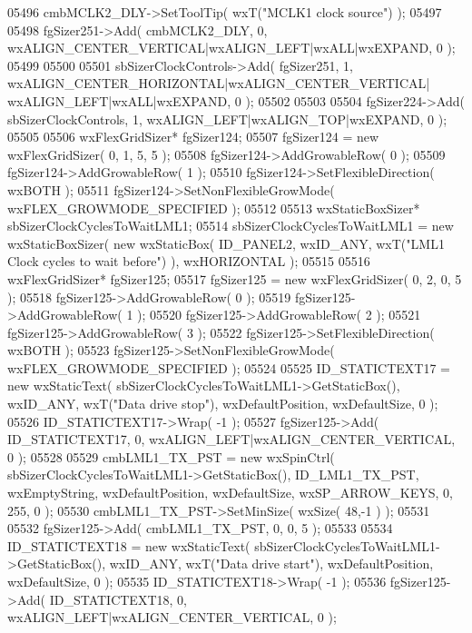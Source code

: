 \begin{DoxyCode}
05496     cmbMCLK2_DLY->SetToolTip( wxT(\textcolor{stringliteral}{"MCLK1 clock source"}) );
05497     
05498     fgSizer251->Add( cmbMCLK2_DLY, 0, wxALIGN\_CENTER\_VERTICAL|wxALIGN\_LEFT|wxALL|wxEXPAND, 0 );
05499     
05500     
05501     sbSizerClockControls->Add( fgSizer251, 1, wxALIGN\_CENTER\_HORIZONTAL|wxALIGN\_CENTER\_VERTICAL|
      wxALIGN\_LEFT|wxALL|wxEXPAND, 0 );
05502     
05503     
05504     fgSizer224->Add( sbSizerClockControls, 1, wxALIGN\_LEFT|wxALIGN\_TOP|wxEXPAND, 0 );
05505     
05506     wxFlexGridSizer* fgSizer124;
05507     fgSizer124 = \textcolor{keyword}{new} wxFlexGridSizer( 0, 1, 5, 5 );
05508     fgSizer124->AddGrowableRow( 0 );
05509     fgSizer124->AddGrowableRow( 1 );
05510     fgSizer124->SetFlexibleDirection( wxBOTH );
05511     fgSizer124->SetNonFlexibleGrowMode( wxFLEX\_GROWMODE\_SPECIFIED );
05512     
05513     wxStaticBoxSizer* sbSizerClockCyclesToWaitLML1;
05514     sbSizerClockCyclesToWaitLML1 = \textcolor{keyword}{new} wxStaticBoxSizer( \textcolor{keyword}{new} wxStaticBox( 
      ID_PANEL2, wxID\_ANY, wxT(\textcolor{stringliteral}{"LML1 Clock cycles to wait before"}) ), wxHORIZONTAL );
05515     
05516     wxFlexGridSizer* fgSizer125;
05517     fgSizer125 = \textcolor{keyword}{new} wxFlexGridSizer( 0, 2, 0, 5 );
05518     fgSizer125->AddGrowableRow( 0 );
05519     fgSizer125->AddGrowableRow( 1 );
05520     fgSizer125->AddGrowableRow( 2 );
05521     fgSizer125->AddGrowableRow( 3 );
05522     fgSizer125->SetFlexibleDirection( wxBOTH );
05523     fgSizer125->SetNonFlexibleGrowMode( wxFLEX\_GROWMODE\_SPECIFIED );
05524     
05525     ID_STATICTEXT17 = \textcolor{keyword}{new} wxStaticText( sbSizerClockCyclesToWaitLML1->GetStaticBox(), wxID\_ANY, wxT(\textcolor{stringliteral}{"Data
       drive stop"}), wxDefaultPosition, wxDefaultSize, 0 );
05526     ID_STATICTEXT17->Wrap( -1 );
05527     fgSizer125->Add( ID_STATICTEXT17, 0, wxALIGN\_LEFT|wxALIGN\_CENTER\_VERTICAL, 0 );
05528     
05529     cmbLML1_TX_PST = \textcolor{keyword}{new} wxSpinCtrl( sbSizerClockCyclesToWaitLML1->GetStaticBox(), 
      ID_LML1_TX_PST, wxEmptyString, wxDefaultPosition, wxDefaultSize, wxSP\_ARROW\_KEYS, 0, 255, 0 );
05530     cmbLML1_TX_PST->SetMinSize( wxSize( 48,-1 ) );
05531     
05532     fgSizer125->Add( cmbLML1_TX_PST, 0, 0, 5 );
05533     
05534     ID_STATICTEXT18 = \textcolor{keyword}{new} wxStaticText( sbSizerClockCyclesToWaitLML1->GetStaticBox(), wxID\_ANY, wxT(\textcolor{stringliteral}{"Data
       drive start"}), wxDefaultPosition, wxDefaultSize, 0 );
05535     ID_STATICTEXT18->Wrap( -1 );
05536     fgSizer125->Add( ID_STATICTEXT18, 0, wxALIGN\_LEFT|wxALIGN\_CENTER\_VERTICAL, 0 );

\end{DoxyCode}
